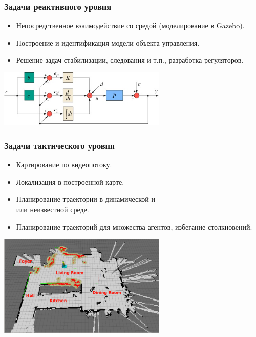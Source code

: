 \documentclass[12pt]{beamer}
\begin{document}
\begin{frame}
\frametitle{Задачи реактивного уровня}
\begin{itemize}
	\item Непосредственное взаимодействие со средой (моделирование в Gazebo).
	\item Построение и идентификация модели объекта управления.
	\item Решение задач стабилизации, следования и т.п., разработка регуляторов.
\end{itemize}
\par\bigskip
\begin{center}
	\includegraphics[width=0.6\textwidth]{pid.jpg}
	
\end{center}
\end{frame}

\begin{frame}
\frametitle{Задачи тактического уровня}
\begin{itemize}
	\item Картирование по видеопотоку.
	\item Локализация в построенной карте.
	\item Планирование траектории в динамической и\\или неизвестной среде.
	\item Планирование траекторий для множества агентов, избегание столкновений.
\end{itemize}
\par\bigskip
\begin{center}
	\includegraphics[width=0.6\textwidth]{loca.png}
	
\end{center}
\end{frame}
\end{document}
